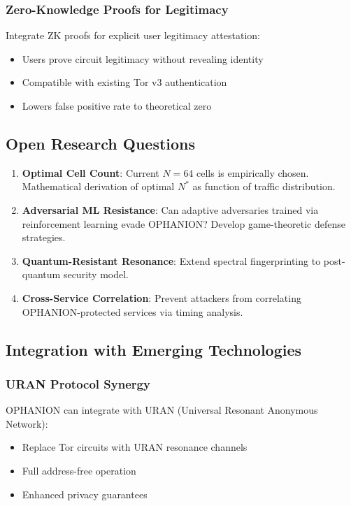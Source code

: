 \documentclass[11pt,a4paper]{article}
\begin{document}
\subsubsection{Zero-Knowledge Proofs for Legitimacy}

Integrate ZK proofs for explicit user legitimacy attestation:
\begin{itemize}
\item Users prove circuit legitimacy without revealing identity
\item Compatible with existing Tor v3 authentication
\item Lowers false positive rate to theoretical zero
\end{itemize}

\subsection{Open Research Questions}

\begin{enumerate}
\item \textbf{Optimal Cell Count}: Current $N = 64$ cells is empirically chosen. Mathematical derivation of optimal $N^*$ as function of traffic distribution.

\item \textbf{Adversarial ML Resistance}: Can adaptive adversaries trained via reinforcement learning evade OPHANION? Develop game-theoretic defense strategies.

\item \textbf{Quantum-Resistant Resonance}: Extend spectral fingerprinting to post-quantum security model.

\item \textbf{Cross-Service Correlation}: Prevent attackers from correlating OPHANION-protected services via timing analysis.
\end{enumerate}

\subsection{Integration with Emerging Technologies}

\subsubsection{URAN Protocol Synergy}

OPHANION can integrate with URAN (Universal Resonant Anonymous Network):
\begin{itemize}
\item Replace Tor circuits with URAN resonance channels
\item Full address-free operation
\item Enhanced privacy guarantees
\end{itemize}
\end{document}
